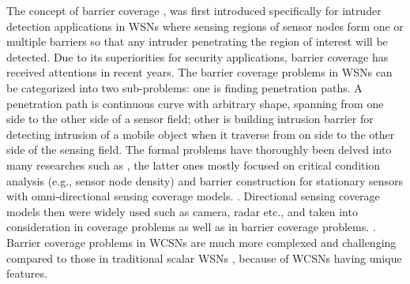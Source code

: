The concept of barrier coverage \cite{kumar2005barrier}, was first introduced specifically for intruder detection applications in WSNs where sensing regions of sensor nodes form one or multiple barriers so that any intruder penetrating the region of interest will be detected. Due to its superiorities for security applications, barrier coverage has received attentions in recent years. The barrier coverage problems in WSNs can be categorized into two sub-problems: one is finding penetration paths. A penetration path is continuous curve with arbitrary shape, spanning from one side to the other side of a sensor field; other is building intrusion barrier for detecting intrusion of a mobile object when it traverse from on side to the other side of the sensing field. The formal problems have thoroughly been delved into many researches such as \cite{megerian2002exposure,binh2016heuristic,liu2013percolation,binh2017genetic,binh2019efficient}, the latter ones mostly focused on critical condition analysis (e.g., sensor node density) and barrier construction for stationary sensors with omni-directional sensing coverage models. \cite{liu2008strong,saipulla2008barrier,he2010distributed,skraba2007energy,chen2013energy}. Directional sensing coverage models then were widely used such as camera, radar etc., and taken into consideration in coverage problems as well as in barrier coverage problems.
 \cite{ai2006coverage,akyildiz2007survey,guvensan2011coverage,ma2005coverage,soro2005coverage}. Barrier coverage problems in WCSNs are much more complexed and challenging compared to those in traditional scalar WSNs \cite{chang2006collaborative,ma2012minimum,makhoul2009adaptive,wang2011barrier}, because of WCSNs having unique features.
 
